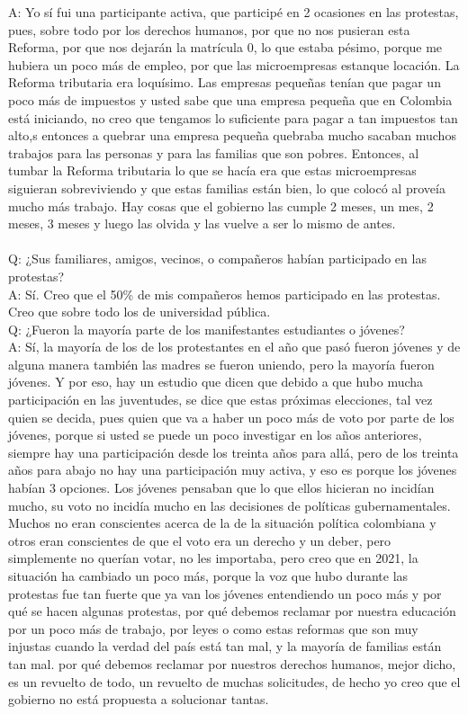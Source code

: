 \documentclass{phyasgn}\usepackage{nag}
\begin{document}
A: Yo sí fui una participante activa, que participé en 2 ocasiones en las protestas, pues, sobre todo por los derechos humanos, por que no nos pusieran esta Reforma, por que nos dejarán la matrícula 0, lo que estaba pésimo, porque me hubiera un poco más de empleo, por que las microempresas estanque locación. La Reforma tributaria era loquísimo. Las empresas pequeñas tenían que pagar un poco más de impuestos y usted sabe que una empresa pequeña que en Colombia está iniciando, no creo que tengamos lo suficiente para pagar a tan impuestos tan alto,s entonces a quebrar una empresa pequeña quebraba mucho sacaban muchos trabajos para las personas y para las familias que son pobres. Entonces, al tumbar la Reforma tributaria lo que se hacía era que estas microempresas siguieran sobreviviendo y que estas familias están bien, lo que colocó al proveía mucho más trabajo. Hay cosas que el gobierno las cumple 2 meses, un mes, 2 meses, 3 meses y luego las olvida y las vuelve a ser lo mismo de antes. \\
\\
Q: ¿Sus familiares, amigos, vecinos, o compañeros habían participado en las protestas?\\
A: Sí. Creo que el 50\% de mis compañeros hemos participado en las protestas. Creo que sobre todo los de universidad pública.\\
Q: ¿Fueron la mayoría parte de los manifestantes estudiantes o jóvenes?\\
A: Sí, la mayoría de los de los protestantes en el año que pasó fueron jóvenes y de alguna manera también las madres se fueron uniendo, pero la mayoría fueron jóvenes. Y por eso, hay un estudio que dicen que debido a que hubo mucha participación en las juventudes, se dice que estas próximas elecciones, tal vez quien se decida, pues quien que va a haber un poco más de voto por parte de los jóvenes, porque si usted se puede un poco investigar en los años anteriores, siempre hay una participación desde los treinta años para allá, pero de los treinta años para abajo no hay una participación muy activa, y eso es porque los jóvenes habían 3 opciones. Los jóvenes pensaban que lo que ellos hicieran no incidían mucho, su voto no incidía mucho en las decisiones de políticas gubernamentales. Muchos no eran conscientes acerca de la de la situación política colombiana y otros eran conscientes de que el voto era un derecho y un deber, pero simplemente no querían votar, no les importaba, pero creo que en 2021,  la situación ha cambiado un poco más, porque la voz que hubo durante las protestas fue tan fuerte que ya van los jóvenes entendiendo un poco más y por qué se hacen algunas protestas, por qué debemos reclamar por nuestra educación por un poco más de trabajo, por leyes o como estas reformas que son muy injustas cuando la verdad del país está tan mal, y la mayoría de familias están tan mal. por qué debemos reclamar por nuestros derechos humanos, mejor dicho, es un revuelto de todo, un revuelto de muchas solicitudes, de hecho yo creo que el gobierno no está propuesta a solucionar tantas. \\
\end{document}

